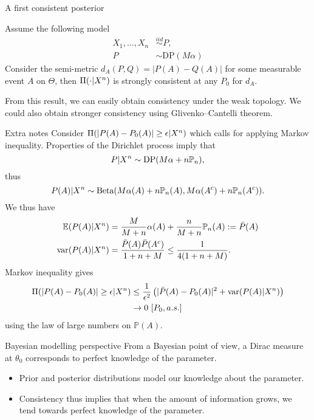\begin{frame}{A first consistent posterior}
\begin{example}
Assume the following model 
\begin{align*}
X_1, \dots, X_n &\overset{iid}{\sim} P, \\ P &\sim \text{DP}(M\alpha)
\end{align*}
Consider the semi-metric $d_A(P,Q) = |P(A) - Q(A)|$ for some measurable event $A$ on $\Theta$, then $\Pi(\cdot |X^n)$ is \alert{strongly consistent} at any $P_0$ for $d_A$. 
\end{example}
\pause 

From this result, we can easily obtain consistency under the weak topology. We could also obtain stronger consistency using Glivenko--Cantelli theorem. 
\end{frame}


\begin{frame}[allowframebreaks]{Extra notes}
	Consider $\Pi(|P(A) - P_0(A)| \geq \epsilon | X^n)$ which calls for applying Markov inequality. Properties of the Dirichlet process imply that $$P\vert X^n \sim \text{DP}(M\alpha + n\mathbb{P}_n),$$ thus $$P(A)\vert X^n \sim \text{Beta}(M\alpha(A) + n\mathbb{P}_n(A), M\alpha(A^c) + n\mathbb{P}_n(A^c)).$$ We thus have 
	\begin{align*}
	\mathbb{E}(P(A)|X^n) &= \frac{M}{M+n} \alpha(A) + \frac{n}{M+n} \mathbb{P}_n(A) := \bar{P}(A)\\
    \mathrm{var}(P(A)|X^n) &= \frac{\bar{P}(A)\bar{P}(A^c)}{1 + n + M} \leq \frac{1}{4(1+n+M)}.
	\end{align*}
Markov inequality gives 
	\begin{align*}
	\Pi(|P(A) - P_0(A)| \geq \epsilon | X^n) &\leq \frac{1}{\epsilon^2} \left( |\bar{P}(A) - P_0(A)|^2 +  \mathrm{var}(P(A)|X^n) \right)\\
	 & \to 0 ~ [P_0, a.s. ] 
	\end{align*}
using the law of large numbers on $\mathbb{P}(A)$.
\end{frame}

\begin{frame}{Bayesian modelling perspective}
From a Bayesian point of view, a \alert{Dirac measure at $\theta_0$} corresponds to perfect knowledge of the parameter. 
\begin{itemize}
	\item Prior and posterior distributions model our knowledge about the parameter.
	\item Consistency thus implies that when the amount of information grows, we tend towards perfect knowledge of the parameter. 
\end{itemize}
\end{frame}

